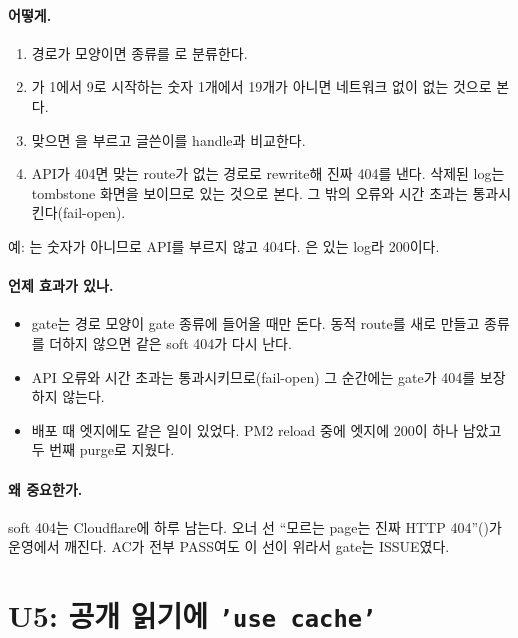 \paragraph{어떻게.}
\begin{enumerate}[nosep]
  \item 경로가  모양이면 종류를 로 분류한다.
  \item {}가 1에서 9로 시작하는 숫자 1개에서 19개가 아니면 네트워크 없이 없는 것으로 본다.
  \item 맞으면 을 부르고 글쓴이를 handle과 비교한다.
  \item API가 404면 맞는 route가 없는 경로로 rewrite해 진짜 404를 낸다. 삭제된 log는 tombstone 화면을 보이므로 있는 것으로 본다. 그 밖의 오류와 시간 초과는 통과시킨다(fail-open).
\end{enumerate}
예: 는 숫자가 아니므로 API를 부르지 않고 404다. 은 있는 log라 200이다.

\paragraph{언제 효과가 있나.}
\begin{itemize}[nosep]
  \item gate는 경로 모양이 gate 종류에 들어올 때만 돈다. 동적 route를 새로 만들고 종류를 더하지 않으면 같은 soft 404가 다시 난다.
  \item API 오류와 시간 초과는 통과시키므로(fail-open) 그 순간에는 gate가 404를 보장하지 않는다.
  \item 배포 때 엣지에도 같은 일이 있었다. PM2 reload 중에 엣지에 200이 하나 남았고 두 번째 purge로 지웠다.
\end{itemize}

\paragraph{왜 중요한가.}
soft 404는 Cloudflare에 하루 남는다. 오너 선 ``모르는 page는 진짜 HTTP 404''()가 운영에서 깨진다.
AC가 전부 PASS여도 이 선이 위라서 gate는 ISSUE였다.

\section{U5: 공개 읽기에 \texttt{'use cache'}}\label{sec:cc3-u5}

